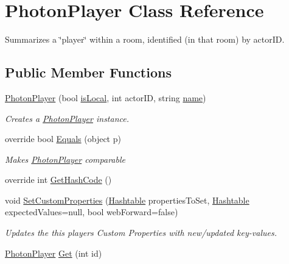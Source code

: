 \hypertarget{class_photon_player}{}\section{Photon\+Player Class Reference}
\label{class_photon_player}


Summarizes a \char`\"{}player\char`\"{} within a room, identified (in that room) by actor\+ID.  


\subsection*{Public Member Functions}
\begin{DoxyCompactItemize}
\item 
\hyperlink{class_photon_player_ab4efd41ca7624963586a30e0d360da67}{Photon\+Player} (bool \hyperlink{class_photon_player_a7d51daf7a538dadae8339e95bf39e692}{is\+Local}, int actor\+ID, string \hyperlink{class_photon_player_a74e5bb916dbfdb6960b8f2f11fa6aba9}{name})
\begin{DoxyCompactList}\small\item\em Creates a \hyperlink{class_photon_player}{Photon\+Player} instance. \end{DoxyCompactList}\item 
override bool \hyperlink{class_photon_player_a2c234cfef38c2013337182a008844398}{Equals} (object p)
\begin{DoxyCompactList}\small\item\em Makes \hyperlink{class_photon_player}{Photon\+Player} comparable \end{DoxyCompactList}\item 
override int \hyperlink{class_photon_player_af88693cf6b3b3fb1c8afdb5892fd525c}{Get\+Hash\+Code} ()
\item 
void \hyperlink{class_photon_player_af8815abb8edaafbe6bddbf328f9612fb}{Set\+Custom\+Properties} (\hyperlink{_extensions_8cs_afa613ef589c02dbd94acc273b62cdcfd}{Hashtable} properties\+To\+Set, \hyperlink{_extensions_8cs_afa613ef589c02dbd94acc273b62cdcfd}{Hashtable} expected\+Values=null, bool web\+Forward=false)
\begin{DoxyCompactList}\small\item\em Updates the this player\textquotesingle{}s Custom Properties with new/updated key-\/values. \end{DoxyCompactList}\item 
\hyperlink{class_photon_player}{Photon\+Player} \hyperlink{class_photon_player_a2aaf48a90dc7e618da31f47c4f1a1c03}{Get} (int id)

\end{DoxyCompactItemize}
